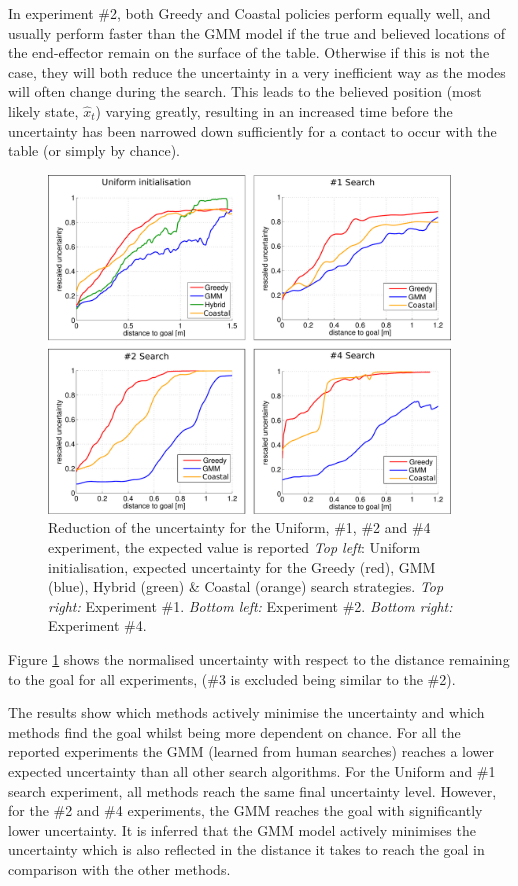 In experiment \#2, both Greedy and Coastal policies perform equally well, and usually perform faster than the GMM model if the true 
and believed locations of the end-effector remain on the surface of the table. Otherwise if this is not the 
case, they will both reduce the uncertainty in a very inefficient way as the modes will often change during the search. 
This leads to the believed position (most likely state, $\hat{x}_t$) varying greatly, resulting in an increased time before the uncertainty 
has been narrowed down sufficiently for a contact to occur with the table (or simply by chance).


\begin{figure}
   \centering
  \includegraphics[width=0.95\textwidth]{./ch3-Search/Figures/Figure12}
\caption{Reduction of the uncertainty for the Uniform, \#1, \#2 and \#4 experiment, the expected value is reported
\textit{Top left}: Uniform initialisation, expected uncertainty for the Greedy (red), GMM (blue), Hybrid (green) \& Coastal (orange) search
 strategies.
\textit{Top right:} Experiment \#1. \textit{Bottom left:} Experiment \#2. \textit{Bottom right:} Experiment \#4.}
\label{fig:uncertainty}
\end{figure}


Figure \ref{fig:uncertainty} shows the normalised uncertainty with respect to the distance remaining to the goal for all experiments, 
(\#3 is excluded being similar to the \#2). 

The results show which methods actively minimise the uncertainty and which methods find the goal whilst being more dependent on chance. 
For all the reported experiments the GMM (learned from human searches) reaches a lower expected uncertainty than all other search algorithms. 
For the Uniform and \#1 search experiment, all methods reach the same final uncertainty level. However, for the \#2 and \#4 experiments, 
the GMM reaches the goal with significantly lower uncertainty. It is inferred that the GMM model actively minimises the uncertainty 
which is also reflected in the distance it takes to reach the goal in comparison with the other methods.

